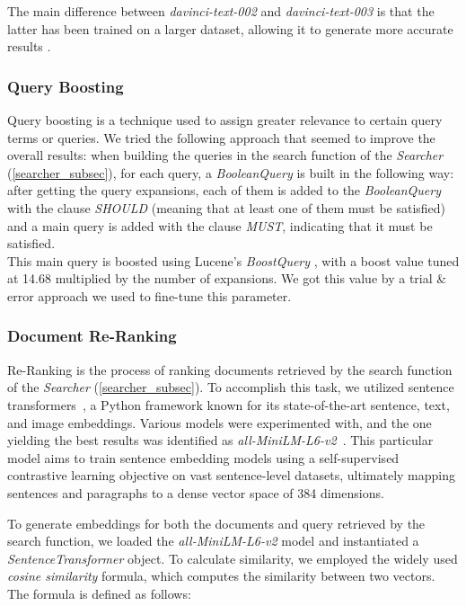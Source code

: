 The main difference between \textit{davinci-text-002} and \textit{davinci-text-003} is that the latter has been trained on a larger dataset, allowing it to generate more accurate results \cite{davincicomparison}.


\subsubsection{Query Boosting}
Query boosting is a technique used to assign greater relevance to certain query terms or queries.\newline
We tried the following approach that seemed to improve the overall results: when building the queries in the search function of the \textit{Searcher} (\ref{searcher_subsec}), for each query, a \textit{BooleanQuery} \cite{lucenebooleanquery} is built in the following way: 
after getting the query expansions, each of them is added to the \textit{BooleanQuery} with the clause \textit{SHOULD} (meaning that at least one of them must be satisfied) and a main query is added with the clause \textit{MUST}, indicating that it must be satisfied. \\
This main query is boosted using Lucene's \textit{BoostQuery} \cite{luceneboostquery}, with a boost value tuned at 14.68 multiplied by the number of expansions. We got this value by a trial \& error approach we used to fine-tune this parameter.



\subsubsection{Document Re-Ranking}
Re-Ranking is the process of ranking documents retrieved by the search function of the \textit{Searcher} (\ref{searcher_subsec}). 
To accomplish this task, we utilized sentence transformers~\cite{sentence-transformers}, a Python framework known for its state-of-the-art sentence, text, and image embeddings. 
Various models were experimented with, and the one yielding the best results was identified as \textit{all-MiniLM-L6-v2}~\cite{huggingfaceallminilml6v2}. 
This particular model aims to train sentence embedding models using a self-supervised contrastive learning objective on vast sentence-level datasets, ultimately mapping sentences and paragraphs to a dense vector space of 384 dimensions.

To generate embeddings for both the documents and query retrieved by the search function, we loaded the \textit{all-MiniLM-L6-v2} model and instantiated a \textit{SentenceTransformer} object. 
To calculate similarity, we employed the widely used \textit{cosine similarity} formula, which computes the similarity between two vectors. The formula is defined as follows:

